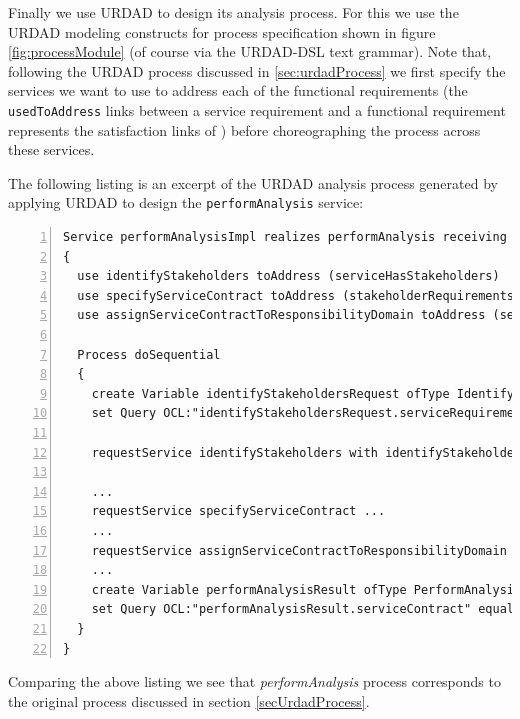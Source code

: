 Finally we use URDAD to design its analysis process. For this we use the URDAD modeling constructs for process specification shown in figure \ref{fig:processModule} (of course via the URDAD-DSL text grammar). Note that, following the URDAD process discussed in \ref{sec:urdadProcess} we first specify the services we want to use to address each of the functional requirements (the \verb+usedToAddress+ links between a service requirement and a functional requirement represents the satisfaction links of \cite{ramesh_toward_2001}) before choreographing the process across these services. 

The following listing is an excerpt of the URDAD analysis process generated by applying URDAD to design the \verb+performAnalysis+ service:
\lstset{language=urdad,caption=Specifying the performAnalysis service in the textual URDAD DSL syntax.,label=serviceTextSyntax}
\begin{lstlisting}[numbers=left,escapechar=|]
Service performAnalysisImpl realizes performAnalysis receiving Variable performAnalysisRequest ofType PerformAnalysisRequest 
{
  use identifyStakeholders toAddress (serviceHasStakeholders) 
  use specifyServiceContract toAddress (stakeholderRequirementsConsistent serviceContractSpecified)
  use assignServiceContractToResponsibilityDomain toAddress (serviceContractAssignedToResponsibilityDomain)
 
  Process doSequential
  {
    create Variable identifyStakeholdersRequest ofType IdentifyStakeholdersRequest
    set Query OCL:"identifyStakeholdersRequest.serviceRequirements" equalTo Query OCL:"performAnalysisRequest.serviceRequirements"
    
    requestService identifyStakeholders with identifyStakeholdersRequest yielding Variable identifyStakeholdersResult ofType IdentifyStakeholdersResult on NoStakeholdersException raiseException NoStakeholdersException

    ...
    requestService specifyServiceContract ...
    ...
    requestService assignServiceContractToResponsibilityDomain ...
    ...
    create Variable performAnalysisResult ofType PerformAnalysisResult
    set Query OCL:"performAnalysisResult.serviceContract" equalTo Query OCL:"specifyServiceContractResult.serviceContract"  
  }                              
}
\end{lstlisting}

Comparing the above listing we see that \emph{performAnalysis} process corresponds to the original process discussed in section \ref{secUrdadProcess}.